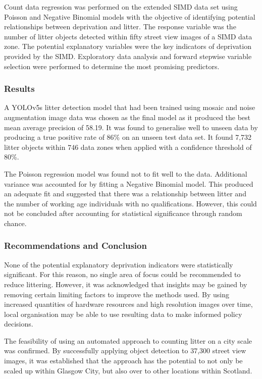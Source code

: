 \documentclass[10pt]{article}
\begin{document}
Count data regression was performed on the extended SIMD data set using Poisson and Negative Binomial models with the objective of identifying potential relationships between deprivation and litter. The response variable was the number of litter objects detected within fifty street view images of a SIMD data zone. The potential explanatory variables were the key indicators of deprivation provided by the SIMD. Exploratory data analysis and forward stepwise variable selection were performed to determine the most promising predictors.

\subsubsection*{Results}

A YOLOv5s litter detection model that had been trained using mosaic and noise augmentation image data was chosen as the final model as it produced the best mean average precision of 58.19. It was found to generalise well to unseen data by producing a true positive rate of 86\% on an unseen test data set. It found 7,732 litter objects within 746 data zones when applied with a confidence threshold of 80\%.

The Poisson regression model was found not to fit well to the data. Additional variance was accounted for by fitting a Negative Binomial model. This produced an adequate fit and suggested that there was a relationship between litter and the number of working age individuals with no qualifications. However, this could not be concluded after accounting for statistical significance through random chance.

\subsubsection*{Recommendations and Conclusion}

None of the potential explanatory deprivation indicators were statistically significant. For this reason, no single area of focus could be recommended to reduce littering. However, it was acknowledged that insights may be gained by removing certain limiting factors to improve the methods used. By using increased quantities of hardware resources and high resolution images over time, local organisation may be able to use resulting data to make informed policy decisions.

The feasibility of using an automated approach to counting litter on a city scale was confirmed. By successfully applying object detection to 37,300 street view images, it was established that the approach has the potential to not only be scaled up within Glasgow City, but also over to other locations within Scotland.
    
\end{document}
